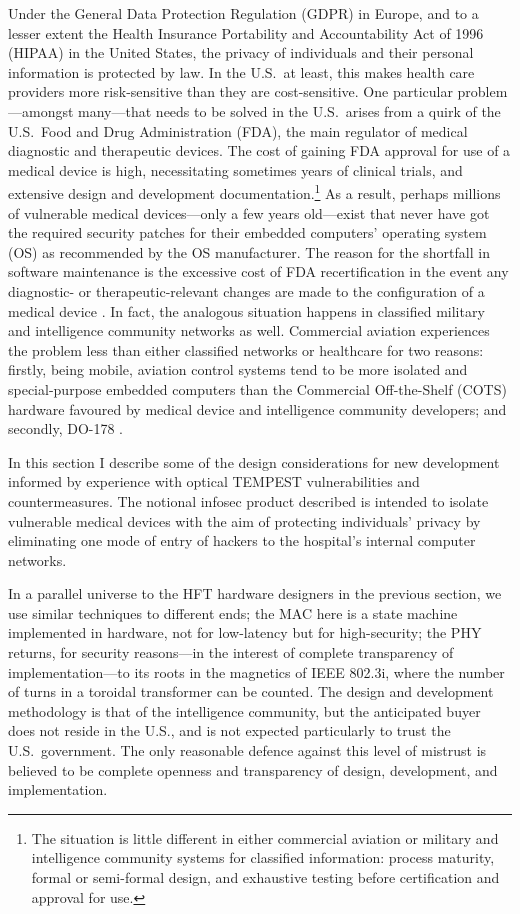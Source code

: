 \documentclass[conference]{IEEEtran}
\begin{document}
Under the General Data Protection Regulation (GDPR) in Europe, and to a
lesser extent the Health Insurance Portability and Accountability Act of 1996
(HIPAA) in the United States, the privacy of individuals and their personal
information is protected by law. In the U.S.\ at least, this makes health
care providers more risk-sensitive than they are cost-sensitive. One
particular problem---amongst many---that needs to be solved in the U.S.\
arises from a quirk of the U.S.\ Food and Drug Administration (FDA), the main
regulator of medical diagnostic and therapeutic devices. The cost of gaining
FDA approval for use of a medical device is high, necessitating sometimes
years of clinical trials, and extensive design and development
documentation.\footnote{The situation is little different in either
commercial aviation or military and intelligence community systems for
classified information: process maturity, formal or semi-formal design, and
exhaustive testing before certification and approval for use.} As a result,
perhaps millions of vulnerable medical devices---only a few years old---exist
that never have got the required security patches for their embedded
computers' operating system (OS) as recommended by the OS manufacturer. The
reason for the shortfall in software maintenance is the excessive cost of FDA
recertification in the event any diagnostic- or therapeutic-relevant changes
are made to the configuration of a medical device \cite{Talbot2012}. In fact,
the analogous situation happens in classified military and intelligence
community networks as well. Commercial aviation experiences the problem less
than either classified networks or healthcare for two reasons: firstly, being
mobile, aviation control systems tend to be more isolated and special-purpose
embedded computers than the Commercial Off-the-Shelf (COTS) hardware favoured
by medical device and intelligence community developers; and secondly, DO-178
\cite{DO-178C}.

In this section I describe some of the design considerations for new
development informed by experience with optical TEMPEST vulnerabilities and
countermeasures. The notional infosec product described is intended to
isolate vulnerable medical devices with the aim of protecting individuals'
privacy by eliminating one mode of entry of hackers to the hospital's
internal computer networks.

In a parallel universe to the HFT hardware designers in the previous section,
we use similar techniques to different ends; the MAC here is a state machine
implemented in hardware, not for low-latency but for high-security; the PHY
returns, for security reasons---in the interest of complete transparency of
implementation---to its roots in the magnetics of IEEE 802.3i, where the
number of turns in a toroidal transformer can be counted. The design and
development methodology is that of the intelligence community, but the
anticipated buyer does not reside in the U.S., and is not expected
particularly to trust the U.S.\ government. The only reasonable defence
against this level of mistrust is believed to be complete openness and
transparency of design, development, and implementation.
\end{document}

